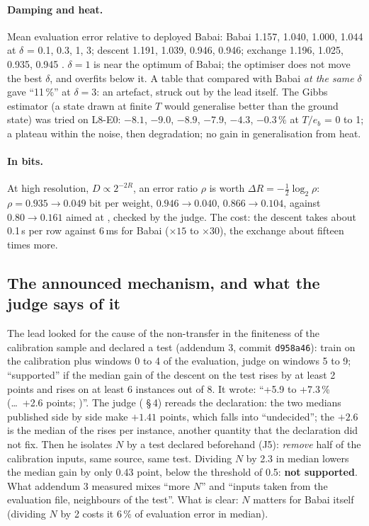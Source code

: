 \paragraph{Damping and heat.} Mean evaluation error relative to deployed Babai: Babai 1.157, 1.040, 1.000, 1.044 at $\delta$ = 0.1, 0.3, 1, 3; descent 1.191, 1.039, 0.946, 0.946; exchange 1.196, 1.025, 0.935, 0.945 \mes. $\delta = 1$ is near the optimum of Babai; the optimiser does not move the best $\delta$, and overfits below it. A table that compared with Babai \emph{at the same} $\delta$ gave ``11\,\%'' at $\delta = 3$: an artefact, struck out by the lead itself. The Gibbs estimator (a state drawn at finite $T$ would generalise better than the ground state) was tried on L8-E0: $-8.1$, $-9.0$, $-8.9$, $-7.9$, $-4.3$, $-0.3\,\%$ at $T/e_b$ = 0 to 1; a plateau within the noise, then degradation; no gain in generalisation from heat.

\paragraph{In bits.} At high resolution, $D \propto 2^{-2R}$, an error ratio $\rho$ is worth $\Delta R = -\tfrac12 \log_2 \rho$: $\rho = 0.935 \to 0.049$ bit per weight, $0.946 \to 0.040$, $0.866 \to 0.104$, against $0.80 \to 0.161$ aimed at \calc, checked by the judge. The cost: the descent takes about 0.1\,s per row against 6\,ms for Babai ($\times 15$ to $\times 30$), the exchange about fifteen times more.

\subsection{The announced mechanism, and what the judge says of it}\label{t3mim:sec:p5-juge}

The lead looked for the cause of the non-transfer in the finiteness of the calibration sample and declared a test (addendum 3, commit \texttt{d958a46}): train on the calibration plus windows 0 to 4 of the evaluation, judge on windows 5 to 9; ``supported'' if the median gain of the descent on the test rises by at least 2 points and rises on at least 6 instances out of 8. It wrote: ``+5.9 to +7.3\,\% (\dots\ +2.6 points; )''. The judge ( §\,4) rereads the declaration: the two medians published side by side make $+1.41$ points, which falls into ``undecided''; the $+2.6$ is the median of the rises per instance, another quantity that the declaration did not fix. Then he isolates $N$ by a test declared beforehand (J5): \emph{remove} half of the calibration inputs, same source, same test. Dividing $N$ by 2.3 in median lowers the median gain by only 0.43 point, below the threshold of 0.5: \textbf{not supported}. What addendum 3 measured mixes ``more $N$'' and ``inputs taken from the evaluation file, neighbours of the test''. What is clear: $N$ matters for Babai itself (dividing $N$ by 2 costs it 6\,\% of evaluation error in median).

